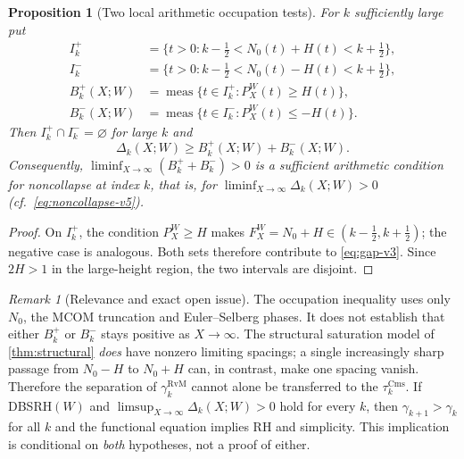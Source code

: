 \documentclass[11pt,a4paper]{article}
\numberwithin{equation}{section}
\newtheorem{proposition}[theorem]{Proposition}
\theoremstyle{definition}
\theoremstyle{remark}
\newtheorem{remark}[theorem]{Remark}
\newcommand{\meas}{\operatorname{meas}}
\newcommand{\Cms}{\mathrm{Cms}}
\begin{document}
\begin{proposition}[Two local arithmetic occupation tests]
\label{prop:occupation-v3}
For $k$ sufficiently large put
\begin{align}
I_k^+&=\{t>0:k-\tfrac12<N_0(t)+H(t)<k+\tfrac12\},\\
I_k^-&=\{t>0:k-\tfrac12<N_0(t)-H(t)<k+\tfrac12\},\\
B_k^+(X;W)&=\meas\{t\in I_k^+:P_X^W(t)\ge H(t)\},\\
B_k^-(X;W)&=\meas\{t\in I_k^-:P_X^W(t)\le-H(t)\}.
\end{align}
Then $I_k^+\cap I_k^-=\varnothing$ for large $k$ and
\begin{equation}\label{eq:occup-v3}
\boxed{\quad\Delta_k(X;W)\ge B_k^+(X;W)+B_k^-(X;W).\quad}
\end{equation}
Consequently, $\liminf_{X\to\infty}(B_k^++B_k^-)>0$
is a sufficient arithmetic condition for noncollapse at index $k$, that is, for $\liminf_{X\to\infty}\Delta_k(X;W)>0$ (cf.\ \eqref{eq:noncollapse-v5}).
\end{proposition}
\begin{proof}
On $I_k^+$, the condition $P_X^W\ge H$ makes
$F_X^W=N_0+H\in(k-\tfrac12,k+\tfrac12)$; the negative case is
analogous. Both sets therefore contribute to \eqref{eq:gap-v3}.
Since $2H>1$ in the large-height region, the two intervals are disjoint.
\end{proof}

\begin{remark}[Relevance and exact open issue]
The occupation inequality uses only $N_0$, the MCOM truncation and
Euler--Selberg phases. It does not establish that either $B_k^+$ or
$B_k^-$ stays positive as $X\to\infty$. The structural saturation
model of \cref{thm:structural} \emph{does} have nonzero limiting spacings;
a single increasingly sharp passage from $N_0-H$ to $N_0+H$ can, in
contrast, make one spacing vanish. Therefore the separation of
$\gamma_k^{\mathrm{RvM}}$ cannot alone be transferred to the $\tau_k^{\Cms}$.
If DBSRH$(W)$ and $\limsup_{X\to\infty}\Delta_k(X;W)>0$
hold for every $k$, then $\gamma_{k+1}>\gamma_k$ for all $k$ and the
functional equation implies RH and simplicity. This implication is
conditional on \emph{both} hypotheses, not a proof of either.
\end{remark}
\end{document}
